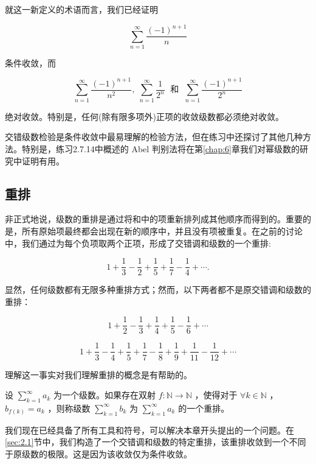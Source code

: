 就这一新定义的术语而言，我们已经证明

\[
\mathop{\sum }\limits_{{n = 1}}^{\infty }\frac{{\left( -1\right) }^{n + 1}}{n}
\]

条件收敛，而

\[
\mathop{\sum }\limits_{{n = 1}}^{\infty }\frac{{\left( -1\right) }^{n + 1}}{{n}^{2}},\;\mathop{\sum }\limits_{{n = 1}}^{\infty }\frac{1}{{2}^{n}}\;\text{ 和 }\;\mathop{\sum }\limits_{{n = 1}}^{\infty }\frac{{\left( -1\right) }^{n + 1}}{{2}^{n}}
\]

绝对收敛。特别是，任何(除有限多项外)正项的收敛级数都必须绝对收敛。

交错级数检验是条件收敛中最易理解的检验方法，但在练习中还探讨了其他几种方法。特别是，练习2.7.14中概述的 Abel 判别法将在第\ref{chap:6}章我们对幂级数的研究中证明有用。

\subsection{重排}
非正式地说，级数的重排是通过将和中的项重新排列成其他顺序而得到的。重要的是，所有原始项最终都会出现在新的顺序中，并且没有项被重复。在之前的讨论中，我们通过为每个负项取两个正项，形成了交错调和级数的一个重排:

\[
1 + \frac{1}{3} - \frac{1}{2} + \frac{1}{5} + \frac{1}{7} - \frac{1}{4} + \cdots .
\]

显然，任何级数都有无限多种重排方式；然而，以下两者都不是原交错调和级数的重排：

\[
1 + \frac{1}{2} - \frac{1}{3} + \frac{1}{4} + \frac{1}{5} - \frac{1}{6} + \cdots
\]


\[
1 + \frac{1}{3} - \frac{1}{4} + \frac{1}{5} + \frac{1}{7} - \frac{1}{8} + \frac{1}{9} + \frac{1}{11} - \frac{1}{12} + \cdots
\]

理解这一事实对我们理解重排的概念是有帮助的。

\begin{Def}
  \label{def:2.7.9}
设 \(\mathop{\sum }\limits_{{k = 1}}^{\infty }{a}_{k}\) 为一个级数。如果存在双射 \(f : \mathbb{N} \rightarrow  \mathbb{N}\) ，使得对于 \(\forall k \in  \mathbb{N}\) ， \({b}_{f\left( k\right) } = {a}_{k}\) ，则称级数 \(\mathop{\sum }\limits_{{k = 1}}^{\infty }{b}_{k}\) 为 \(\mathop{\sum }\limits_{{k = 1}}^{\infty }{a}_{k}\) 的一个重排。
\end{Def}

我们现在已经具备了所有工具和符号，可以解决本章开头提出的一个问题。在\ref{sec:2.1}节中，我们构造了一个交错调和级数的特定重排，该重排收敛到一个不同于原级数的极限。这是因为该收敛仅为条件收敛。

